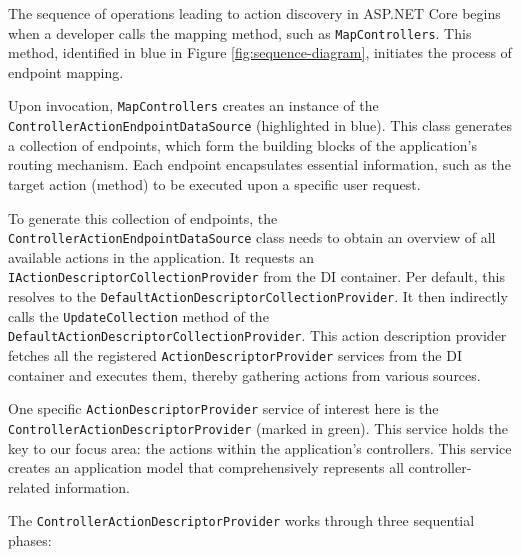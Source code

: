 The sequence of operations leading to action discovery in ASP.NET Core begins when a developer calls the mapping method, such as \texttt{MapControllers}. This method, identified in blue in Figure \ref{fig:sequence-diagram}, initiates the process of endpoint mapping.

Upon invocation, \texttt{MapControllers} creates an instance of the \texttt{ControllerActionEndpointDataSource} (highlighted in blue). This class generates a collection of endpoints, which form the building blocks of the application's routing mechanism. Each endpoint encapsulates essential information, such as the target action (method) to be executed upon a specific user request.

To generate this collection of endpoints, the \texttt{ControllerActionEndpointDataSource} class needs to obtain an overview of all available actions in the application. It requests an \texttt{IActionDescriptorCollectionProvider} from the DI container. Per default, this resolves to the \texttt{DefaultActionDescriptorCollectionProvider}. It then indirectly calls the \texttt{UpdateCollection} method of the \texttt{DefaultActionDescriptorCollectionProvider}. This action description provider fetches all the registered \texttt{ActionDescriptorProvider} services from the DI container and executes them, thereby gathering actions from various sources.

One specific \texttt{ActionDescriptorProvider} service of interest here is the \texttt{ControllerActionDescriptorProvider} (marked in green). This service holds the key to our focus area: the actions within the application's controllers. This service creates an application model that comprehensively represents all controller-related information.

The \texttt{ControllerActionDescriptorProvider} works through three sequential phases:

